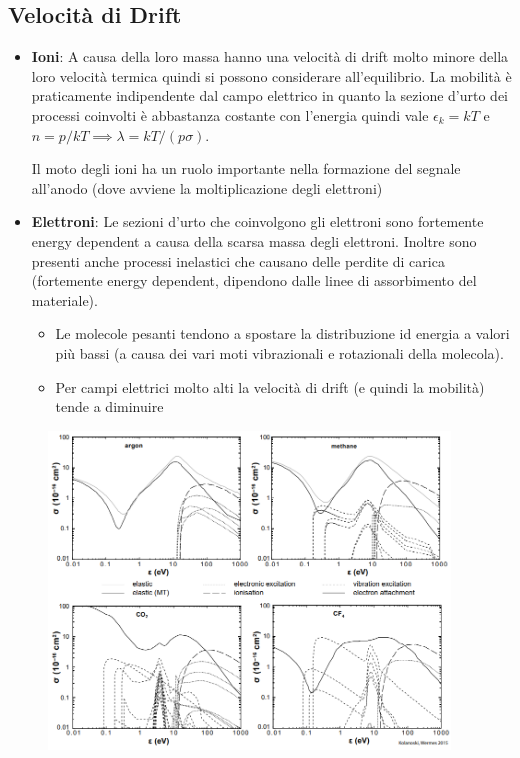 \subsection*{Velocità di Drift}
\begin{itemize}
    \item \textbf{Ioni}: A causa della loro massa hanno una velocità di drift molto minore della loro velocità termica quindi si possono considerare all'equilibrio.
  La mobilità è praticamente indipendente dal campo elettrico in quanto la sezione d'urto dei processi coinvolti è abbastanza costante con l'energia quindi vale $\epsilon_k=kT$ e $n=p/kT\implies \lambda=kT/(p\sigma)$.

  Il moto degli ioni ha un ruolo importante nella formazione del segnale all'anodo (dove avviene la moltiplicazione degli elettroni)

\item \textbf{Elettroni}: Le sezioni d'urto che coinvolgono gli elettroni sono fortemente energy dependent a causa della scarsa massa degli elettroni. 
  Inoltre sono presenti anche processi inelastici che causano delle perdite di carica (fortemente energy dependent, dipendono dalle linee di assorbimento del materiale).
  \begin{itemize}
    \item Le molecole pesanti tendono a spostare la distribuzione id energia a valori più bassi (a causa dei vari moti vibrazionali e rotazionali della molecola).

    \item Per campi elettrici molto alti la velocità di drift (e quindi la mobilità) tende a diminuire
  \end{itemize}
\end{itemize}



  \begin{figure}[H]
    \centering
    \includegraphics[width=0.95\textwidth,frame]{Chapters/images/Interazione_radiazione_materia/image-20220222172045918.png}

  \end{figure}

